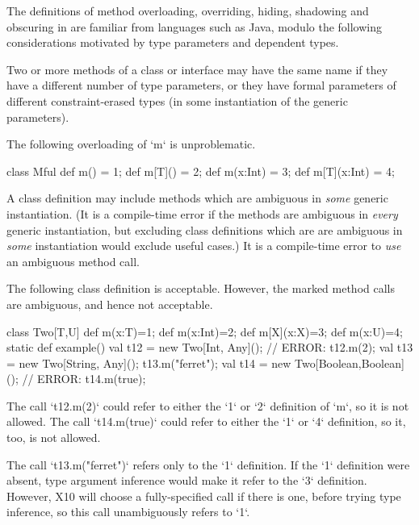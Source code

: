 The definitions of method overloading, overriding, hiding, shadowing and
obscuring in \Xten{} are familiar from languages such as Java, modulo the
following considerations motivated by type parameters and dependent types.



Two or more methods of a class or interface may have the same
name if they have a different number of type parameters, or
they have formal parameters of different constraint-erased types (in some instantiation of the
generic parameters). 



\begin{ex}
The following overloading of \xcd`m` is unproblematic.
\begin{xten}
class Mful{
   def m() = 1;
   def m[T]() = 2;
   def m(x:Int) = 3;
   def m[T](x:Int) = 4;
}
\end{xten}
%
\end{ex}


A class definition may include methods which are ambiguous in {\em some}
generic instantiation. (It is a compile-time error if the methods are
ambiguous in {\em every} generic instantiation, but excluding class
definitions which are are ambiguous in {\em some} instantiation would exclude
useful cases.)  It is a compile-time error to {\em use} an ambiguous method
call. 

\begin{ex}
The following class definition is acceptable.  However, the marked method
calls are ambiguous, and hence not acceptable.
\begin{xten}
class Two[T,U]{
  def m(x:T)=1;
  def m(x:Int)=2;
  def m[X](x:X)=3;
  def m(x:U)=4;
  static def example() {
    val t12 = new Two[Int, Any]();
    // ERROR: t12.m(2);
    val t13  = new Two[String, Any]();
    t13.m("ferret");
    val t14 = new Two[Boolean,Boolean]();
    // ERROR: t14.m(true);
  }
}
\end{xten}
\noindent
The call \xcd`t12.m(2)` could refer to either the \xcd`1` or \xcd`2`
definition of \xcd`m`, so it is not allowed.   
The call \xcd`t14.m(true)` could refer to either the \xcd`1` or \xcd`4`
definition, so it, too, is not allowed.

The call \xcd`t13.m("ferret")` refers only to the \xcd`1` definition.  If
the \xcd`1` definition were absent, type argument inference would make it
refer to the \xcd`3` definition.  However, X10 will choose a fully-specified
call if there is one, before trying type inference, so this call unambiguously
refers to \xcd`1`.
\end{ex}



